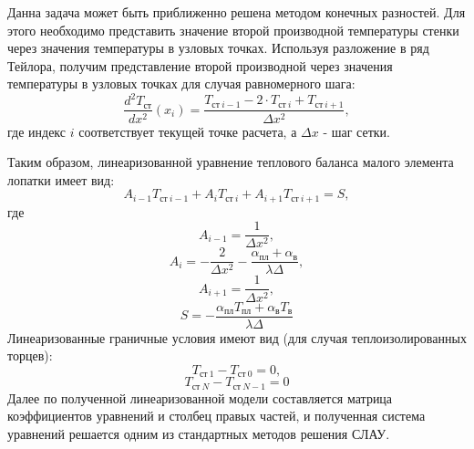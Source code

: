 \documentclass[a4paper,10pt]{article}
\begin{document}
    Данна задача может быть приближенно решена методом конечных разностей.
    Для этого необходимо представить значение второй производной температуры стенки через значения температуры в
    узловых точках.
    Используя разложение в ряд Тейлора, получим представление второй производной через значения температуры в
    узловых точках для случая равномерного шага:
    \[
        \frac{d^2 T_{ст}}{dx^2}(x_i) = \frac{T_{ст\ i-1} - 2 \cdot T_{ст\ i} + T_{ст\ i+1}}{\Delta x^2},
    \]
    где индекс $i$ соответствует текущей точке расчета, а $\Delta x$ - шаг сетки.

    Таким образом, линеаризованной уравнение теплового баланса малого элемента лопатки имеет вид:
    \[
        A_{i-1} T_{ст\ i-1} + A_{i} T_{ст\ i} + A_{i+1} T_{ст\ i+1} = S,
    \]
    где
    \[
        A_{i-1} = \frac{1}{\Delta x^2},\]
    \[    A_i = -\frac{2}{\Delta x^2} - \frac{\alpha_{пл} + \alpha_в}{\lambda \Delta},\]
    \[    A_{i+1} =\frac{1}{\Delta x^2},\]
    \[    S = - \frac{\alpha_{пл} T_{пл} + \alpha_в T_в}{\lambda \Delta}\]
    Линеаризованные граничные условия имеют вид (для случая теплоизолированных торцев):
    \[
        T_{ст\ 1} - T_{ст\ 0} = 0,\]
    \[   T_{ст\ N} - T_{ст\ N-1} = 0
    \]
    Далее по полученной линеаризованной модели составляется матрица коэффициентов уравнений и столбец правых частей,
    и полученная система уравнений решается одним из стандартных методов решения СЛАУ.

\end{document}
